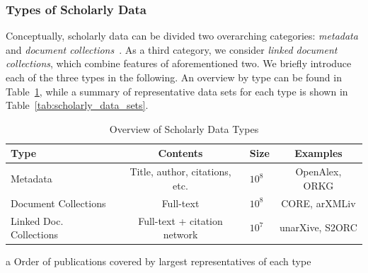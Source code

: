 \subsubsection{Types of Scholarly Data}

Conceptually, scholarly data can be divided two overarching categories: \emph{metadata} and \emph{document collections}~\cite{Nasar2018}. As a third category, we consider \emph{linked document collections}, which combine features of aforementioned two.
We briefly introduce each of the three types in the following. An overview by type can be found in Table~\ref{tab:data_types}, while a summary of representative data sets for each type is shown in Table~\ref{tab:scholarly_data_sets}.

\begin{table}[tb]
  \caption{Overview of Scholarly Data Types}
  \label{tab:data_types}
  \centering
  \begin{small}
    \begin{threeparttable}
      \begin{tabular}{lclc}
        \toprule
        Type                       & Contents                             & Size\tnote{a} & Examples \\
        \midrule
        Metadata                   & Title, author, citations, etc.       & \(10^8\)              & OpenAlex, ORKG \\
        Document Collections       & Full-text                            & \(10^8\)              & CORE, arXMLiv \\
        Linked Doc. Collections    & Full-text + citation network         & \(10^7\)              & unarXive, S2ORC \\
        \bottomrule
      \end{tabular}
      \begin{tablenotes}
        \item[a] Order of publications covered by largest representatives of each type
      \end{tablenotes}
    \end{threeparttable}
  \end{small}
\end{table}

